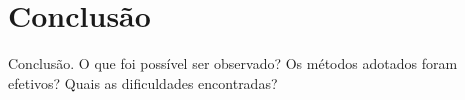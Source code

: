 \section{Conclusão}
Conclusão. O que foi possível ser observado? Os métodos adotados foram efetivos? Quais as dificuldades encontradas?
